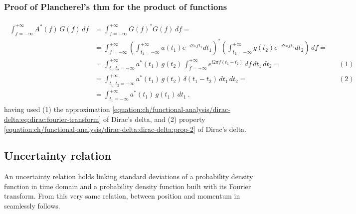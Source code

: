 \documentclass[letterpaper,10pt,english]{jupyterBook}
\begin{document}
\subsubsection*{Proof of Plancherel’s thm for the product of functions}
\begin{equation*}
\begin{split}\begin{aligned}
\int_{f=-\infty}^{+\infty} A^*(f) \, G(f) \, df 
& = \int_{f=-\infty}^{+\infty} G(f)^* G(f) \, df =  \\
& = \int_{f=-\infty}^{+\infty} \left( \int_{t_1=-\infty}^{+\infty} a(t_1) e^{-i 2 \pi f t_1} dt_1 \right)^* \left( \int_{t_2=-\infty}^{+\infty} g(t_2) e^{-i 2 \pi f t_2} dt_2  \right) \, df =  \\
& =  \int_{t_1, t_2=-\infty}^{+\infty} a^*(t_1) \, g(t_2) \, \int_{f=-\infty}^{+\infty} e^{i 2 \pi f ( t_1 - t_2 )} \, df \, dt_1 \, dt_2 =  && (1) \\
& =  \int_{t_1, t_2=-\infty}^{+\infty} a^*(t_1) \, g(t_2) \, \delta( t_1 - t_2 ) \, dt_1 \, dt_2 = && (2) \\
& =  \int_{t_1=-\infty}^{+\infty} a^*(t_1) \, g(t_1) \, dt_1 \ .
\end{aligned}\end{split}
\end{equation*}
\sphinxAtStartPar
having used (1) the approximation \eqref{equation:ch/functional-analysis/dirac-delta:eq:dirac:fourier-transform} of Dirac’s delta, and (2) property \eqref{equation:ch/functional-analysis/dirac-delta:dirac-delta:prop-2} of Dirac’s delta.


\subsection{Uncertainty relation}
\label{\detokenize{ch/complex/fourier-transform:uncertainty-relation}}\label{\detokenize{ch/complex/fourier-transform:complex-fourier-transform-uncertainty}}
\sphinxAtStartPar
An uncertainty relation holds linking standard deviations of a probability density function in time domain and a probability density function built with its Fourier transform. From this very same relation,  between position and momentum in  seamlessly follows.
\end{document}
